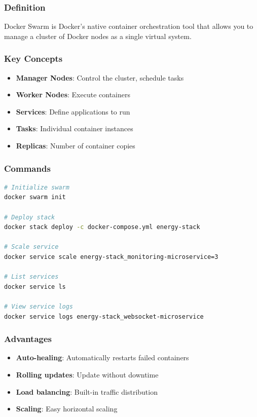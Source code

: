 \documentclass[12pt,a4paper]{article}
\begin{document}
\subsubsection{Definition}
Docker Swarm is Docker's native container orchestration tool that allows you to manage a cluster of Docker nodes as a single virtual system.

\subsubsection{Key Concepts}
\begin{itemize}
    \item \textbf{Manager Nodes}: Control the cluster, schedule tasks
    \item \textbf{Worker Nodes}: Execute containers
    \item \textbf{Services}: Define applications to run
    \item \textbf{Tasks}: Individual container instances
    \item \textbf{Replicas}: Number of container copies
\end{itemize}

\subsubsection{Commands}
\begin{lstlisting}[language=bash, caption=Docker Swarm Commands]
# Initialize swarm
docker swarm init

# Deploy stack
docker stack deploy -c docker-compose.yml energy-stack

# Scale service
docker service scale energy-stack_monitoring-microservice=3

# List services
docker service ls

# View service logs
docker service logs energy-stack_websocket-microservice
\end{lstlisting}

\subsubsection{Advantages}
\begin{itemize}
    \item \textbf{Auto-healing}: Automatically restarts failed containers
    \item \textbf{Rolling updates}: Update without downtime
    \item \textbf{Load balancing}: Built-in traffic distribution
    \item \textbf{Scaling}: Easy horizontal scaling
\end{itemize}
\end{document}
